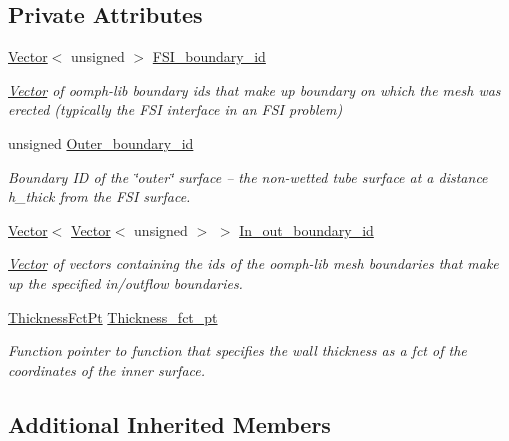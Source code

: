 \subsection*{Private Attributes}
\begin{DoxyCompactItemize}
\item 
\hyperlink{classoomph_1_1Vector}{Vector}$<$ unsigned $>$ \hyperlink{classoomph_1_1ThinLayerBrickOnTetMesh_ad2b0a664fa1fc0f6f530740e40591212}{F\+S\+I\+\_\+boundary\+\_\+id}
\begin{DoxyCompactList}\small\item\em \hyperlink{classoomph_1_1Vector}{Vector} of oomph-\/lib boundary ids that make up boundary on which the mesh was erected (typically the F\+SI interface in an F\+SI problem) \end{DoxyCompactList}\item 
unsigned \hyperlink{classoomph_1_1ThinLayerBrickOnTetMesh_a93acb15ee2a6fd52a21c31830b2a984b}{Outer\+\_\+boundary\+\_\+id}
\begin{DoxyCompactList}\small\item\em Boundary ID of the \char`\"{}outer\char`\"{} surface -- the non-\/wetted tube surface at a distance h\+\_\+thick from the F\+SI surface. \end{DoxyCompactList}\item 
\hyperlink{classoomph_1_1Vector}{Vector}$<$ \hyperlink{classoomph_1_1Vector}{Vector}$<$ unsigned $>$ $>$ \hyperlink{classoomph_1_1ThinLayerBrickOnTetMesh_aa8990092c886c1f5ac89b4476bf75b39}{In\+\_\+out\+\_\+boundary\+\_\+id}
\begin{DoxyCompactList}\small\item\em \hyperlink{classoomph_1_1Vector}{Vector} of vectors containing the ids of the oomph-\/lib mesh boundaries that make up the specified in/outflow boundaries. \end{DoxyCompactList}\item 
\hyperlink{classoomph_1_1ThinLayerBrickOnTetMesh_aed34f7d1e9a5c6b5f3e220cb5bdf4550}{Thickness\+Fct\+Pt} \hyperlink{classoomph_1_1ThinLayerBrickOnTetMesh_a51d5c130c6b267fc8996e02d1172c81d}{Thickness\+\_\+fct\+\_\+pt}
\begin{DoxyCompactList}\small\item\em Function pointer to function that specifies the wall thickness as a fct of the coordinates of the inner surface. \end{DoxyCompactList}\end{DoxyCompactItemize}
\subsection*{Additional Inherited Members}


